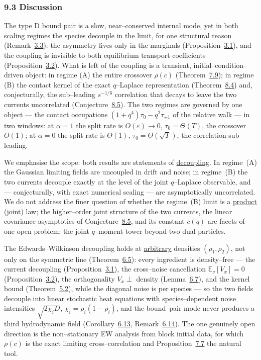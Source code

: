 \documentclass[11pt]{article}
\theoremstyle{plain}
\theoremstyle{definition}
\theoremstyle{remark}
\newcommand{\E}{\mathbb{E}}\newcommand{\PP}{\mathbb{P}}\newcommand{\dd}{\,\mathrm{d}}
\newcommand{\eps}{\varepsilon}\newcommand{\Exp}{\mathrm{Exp}}
\begin{document}
\subsubsection{9.3 Discussion}\label{sec_disc}

The type D bound pair is a slow, near--conserved internal mode, yet in both scaling
regimes the species decouple in the limit, for one structural reason
(Remark~\hyperref[rem_transport]{3.3}): the asymmetry lives only in the marginals
(Proposition~\hyperref[prop_decouple]{3.1}), and the coupling is invisible to both equilibrium
transport coefficients (Proposition~\hyperref[prop_cross]{3.2}). What is left of the coupling is a
transient, initial--condition--driven object: in regime (A) the entire crossover
$\rho(c)$ (Theorem~\hyperref[thm_closed]{7.9}); in regime (B) the contact kernel of the exact
$q$--Laplace representation (Theorem~\hyperref[thm_cov]{8.4}) and, conjecturally, the
sub--leading $s^{-1/6}$ correlation that decays to leave the two currents
uncorrelated (Conjecture~\hyperref[conj_cov]{8.5}).
The two regimes are governed by one object --- the contact occupations
$(1+q^4)\tau_0-q^2\tau_{\pm1}$ of the relative walk --- in two
windows: at $\alpha=1$ the split rate is
$O(\eps)\to0$, $\tau_0=\Theta(T)$, the crossover $O(1)$; at $\alpha=0$ the split rate
is $\Theta(1)$, $\tau_0=\Theta(\sqrt T)$, the correlation sub--leading.

We emphasise the scope: both results are statements of \underline{decoupling}. In regime~(A)
the Gaussian limiting fields are uncoupled in drift and noise; in regime~(B) the two
currents decouple exactly at the level of the joint $q$--Laplace observable, and ---
conjecturally, with exact numerical scaling --- are asymptotically uncorrelated. We
do not address the finer question of whether the regime~(B) limit is a \underline{product}
(joint) law; the higher--order joint structure of the two currents, the linear
covariance asymptotics of Conjecture~\hyperref[conj_cov]{8.5}, and its constant $c(q)$ are
facets of one open problem: the joint $q$--moment tower beyond two dual particles.

The Edwards--Wilkinson decoupling holds at \underline{arbitrary} densities $(\rho_1,\rho_2)$,
not only on the symmetric line (Theorem~\hyperref[thm_ewmain]{6.5}): every ingredient is
density--free --- the current decoupling (Proposition~\hyperref[prop_decouple]{3.1}), the
cross--noise cancellation $\E_\nu[V_x]=0$ (Proposition~\hyperref[prop_cross]{3.2}), the
orthogonality $V_x\perp$ density (Lemma~\hyperref[lem_orth]{6.7}), and the kernel bound
(Theorem~\hyperref[thm_kernel]{5.2}), while the diagonal noise is per species --- so the two
fields decouple into linear stochastic heat equations with species--dependent noise
intensities $\sqrt{2\chi_iD}$, $\chi_i=\rho_i(1-\rho_i)$, and the bound--pair mode never
produces a third hydrodynamic field (Corollary~\hyperref[prop_sym]{6.13}, Remark~\hyperref[rem_offline]{6.14}).
The one genuinely open direction is the non--stationary EW analysis from block initial
data, for which $\rho(c)$ is the exact limiting cross--correlation and
Proposition~\hyperref[prop_twophase]{7.7} the natural tool.
\end{document}
